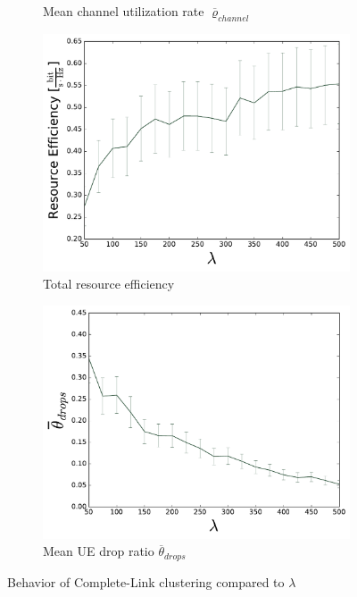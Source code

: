 \begin{figure}
\begin{subfigure}[b]{0.5\linewidth}
    \caption{Mean channel utilization rate $\overline{\varrho}_{channel}$} 
    \label{fig:COMPLETE_8} 
    \vspace{4ex}
  \end{subfigure} 
  \begin{subfigure}[b]{0.5\linewidth}
    \centering
    \captionsetup{justification=centering}
    \includegraphics[width=1\linewidth]{figures/COMPLETE_9} 
    \caption{Total resource efficiency} 
    \label{fig:COMPLETE_9} 
  \end{subfigure}%
  \begin{subfigure}[b]{0.5\linewidth}
    \centering
    \captionsetup{justification=centering}
    \includegraphics[width=1\linewidth]{figures/COMPLETE_10} 
    \caption{Mean UE drop ratio $\overline{\theta}_{drops}$} 
    \label{fig:COMPLETE_10} 
  \end{subfigure} 
  \caption{Behavior of Complete-Link clustering compared to $\lambda$}
  \label{fig:pretty_results_COMPLETE} 
\end{figure}

